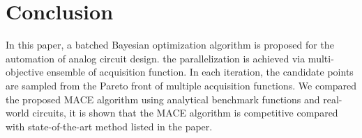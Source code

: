 \section{Conclusion}

In this paper, a batched Bayesian optimization algorithm is proposed for the
automation of analog circuit design. the parallelization is achieved via
multi-objective ensemble of acquisition function. In each iteration, the
candidate points are sampled from the Pareto front of multiple acquisition
functions. We compared the proposed MACE algorithm using analytical benchmark
functions and real-world circuits, it is shown that the MACE algorithm is
competitive compared with state-of-the-art method listed in the paper.
